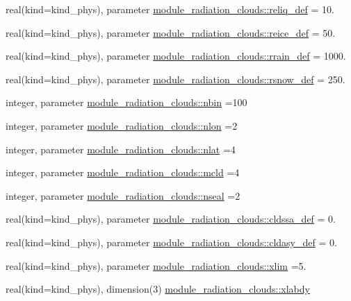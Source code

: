 \begin{DoxyCompactItemize}
\item 
real(kind=kind\+\_\+phys), parameter \hyperlink{group__module__radiation__clouds_ga1768a85f4d8af2ad40b62ae6e6667c1e}{module\+\_\+radiation\+\_\+clouds\+::reliq\+\_\+def} = 10.
\item 
real(kind=kind\+\_\+phys), parameter \hyperlink{group__module__radiation__clouds_ga721e0fb4a34774f5b61f567b9cad8e7b}{module\+\_\+radiation\+\_\+clouds\+::reice\+\_\+def} = 50.
\item 
real(kind=kind\+\_\+phys), parameter \hyperlink{group__module__radiation__clouds_ga93fcaedae02c0f9c4de9f39061379d6b}{module\+\_\+radiation\+\_\+clouds\+::rrain\+\_\+def} = 1000.
\item 
real(kind=kind\+\_\+phys), parameter \hyperlink{group__module__radiation__clouds_ga2b68c4a206e17cb59597f6c4dffc7c1a}{module\+\_\+radiation\+\_\+clouds\+::rsnow\+\_\+def} = 250.
\item 
integer, parameter \hyperlink{group__module__radiation__clouds_gad2947b3c0a8382fbe12b76dd68b290e0}{module\+\_\+radiation\+\_\+clouds\+::nbin} =100
\item 
integer, parameter \hyperlink{group__module__radiation__clouds_gab4d14edea12bbcda5361cad523386c7c}{module\+\_\+radiation\+\_\+clouds\+::nlon} =2
\item 
integer, parameter \hyperlink{group__module__radiation__clouds_gad4274cb223949e858ecc2e6346bed610}{module\+\_\+radiation\+\_\+clouds\+::nlat} =4
\item 
integer, parameter \hyperlink{group__module__radiation__clouds_gafb94f3d62afa49bef6c33f73a7ecad65}{module\+\_\+radiation\+\_\+clouds\+::mcld} =4
\item 
integer, parameter \hyperlink{group__module__radiation__clouds_gaaf2a6549a8c42b9eae3d40d21d1e9532}{module\+\_\+radiation\+\_\+clouds\+::nseal} =2
\item 
real(kind=kind\+\_\+phys), parameter \hyperlink{group__module__radiation__clouds_ga2ce850be46f0144caa09309ae01958c2}{module\+\_\+radiation\+\_\+clouds\+::cldssa\+\_\+def} = 0.
\item 
real(kind=kind\+\_\+phys), parameter \hyperlink{group__module__radiation__clouds_gab94e45a81d8be82b6cb686b35fd78a80}{module\+\_\+radiation\+\_\+clouds\+::cldasy\+\_\+def} = 0.
\item 
real(kind=kind\+\_\+phys), parameter \hyperlink{group__module__radiation__clouds_ga1146f43b680b655d354a9c031ee4a463}{module\+\_\+radiation\+\_\+clouds\+::xlim} =5.
\item 
real(kind=kind\+\_\+phys), dimension(3) \hyperlink{group__module__radiation__clouds_gab2a798da0bb0125d1d5074b73c5951dc}{module\+\_\+radiation\+\_\+clouds\+::xlabdy}

\end{DoxyCompactItemize}
